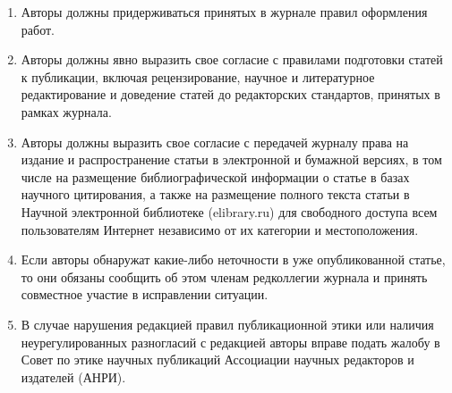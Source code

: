 \documentclass[10pt,a4paper]{book}
\begin{document}
\begin{enumerate}[itemsep=0pt,parsep=2pt,topsep=2pt,partopsep=0pt]
      проведенного исследования и роли этих источников в исследовании.
\item Авторы должны придерживаться принятых в журнале правил оформления работ.
\item Авторы должны явно выразить свое согласие с правилами подготовки статей к
      публикации, включая рецензирование, научное и литературное редактирование и доведение
      статей до редакторских стандартов, принятых в рамках журнала.
\item Авторы должны выразить свое согласие с передачей журналу права на издание и
      распространение статьи в электронной и бумажной версиях, в том числе на размещение
      библиографической информации о статье в базах научного цитирования, а также на
      размещение полного текста статьи в Научной электронной библиотеке (elibrary.ru) для
      свободного доступа всем пользователям Интернет независимо от их категории и
      местоположения.
\item {Если авторы обнаружат какие-либо неточности в уже опубликованной
      статье, то они обязаны сообщить об этом членам редколлегии журнала и принять
      совместное участие в исправлении ситуации.}
\item В случае нарушения редакцией правил публикационной этики или наличия
      неурегулированных разногласий с редакцией авторы вправе подать жалобу в Совет по
      этике научных публикаций Ассоциации научных редакторов и издателей (АНРИ).
\end{enumerate}
\end{document}
